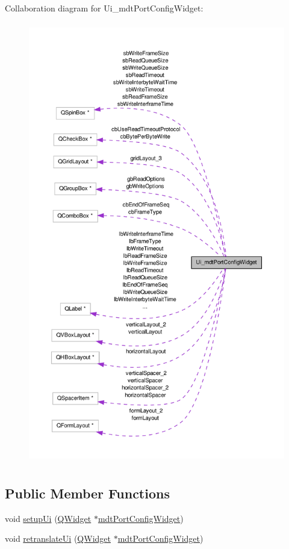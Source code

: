 Collaboration diagram for Ui\-\_\-mdt\-Port\-Config\-Widget\-:
\nopagebreak
\begin{figure}[H]
\begin{center}
\leavevmode
\includegraphics[height=550pt]{class_ui__mdt_port_config_widget__coll__graph}
\end{center}
\end{figure}
\subsection*{Public Member Functions}
\begin{DoxyCompactItemize}
\item 
void \hyperlink{class_ui__mdt_port_config_widget_a6d31592db1dc60b49f4576d6aba13b52}{setup\-Ui} (\hyperlink{class_q_widget}{Q\-Widget} $\ast$\hyperlink{classmdt_port_config_widget}{mdt\-Port\-Config\-Widget})
\item 
void \hyperlink{class_ui__mdt_port_config_widget_ab022687e43d0070dea283dc1f9386869}{retranslate\-Ui} (\hyperlink{class_q_widget}{Q\-Widget} $\ast$\hyperlink{classmdt_port_config_widget}{mdt\-Port\-Config\-Widget})
\end{DoxyCompactItemize}
